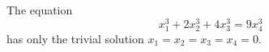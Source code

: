 \begin{proposition}
    The equation
\[
    x_1^3+2x_2^3+4x_3^3=9x_4^3
\]
    has only the trivial solution $x_1=x_2=x_3=x_4=0$.
\end{proposition}
